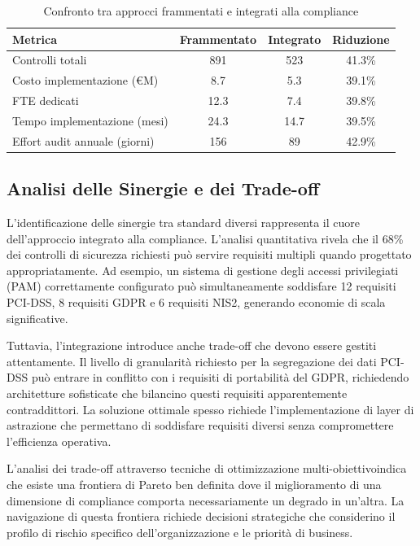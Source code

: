 \begin{table}[h]
\centering
\caption{Confronto tra approcci frammentati e integrati alla compliance}
\label{tab:confronto_compliance}
\begin{tabular}{|l|c|c|c|}
\hline
\textbf{Metrica} & \textbf{Frammentato} & \textbf{Integrato} & \textbf{Riduzione} \\
\hline
Controlli totali & 891 & 523 & 41.3\% \\
Costo implementazione (€M) & 8.7 & 5.3 & 39.1\% \\
FTE dedicati & 12.3 & 7.4 & 39.8\% \\
Tempo implementazione (mesi) & 24.3 & 14.7 & 39.5\% \\
Effort audit annuale (giorni) & 156 & 89 & 42.9\% \\
\hline
\end{tabular}
\end{table}

\subsection{Analisi delle Sinergie e dei Trade-off}

L'identificazione delle sinergie tra standard diversi rappresenta il cuore dell'approccio integrato alla compliance. L'analisi quantitativa rivela che il 68\% dei controlli di sicurezza richiesti può servire requisiti multipli quando progettato appropriatamente. Ad esempio, un sistema di gestione degli accessi privilegiati (PAM) correttamente configurato può simultaneamente soddisfare 12 requisiti PCI-DSS, 8 requisiti GDPR e 6 requisiti NIS2, generando economie di scala significative.

Tuttavia, l'integrazione introduce anche trade-off che devono essere gestiti attentamente. Il livello di granularità richiesto per la segregazione dei dati PCI-DSS può entrare in conflitto con i requisiti di portabilità del GDPR, richiedendo architetture sofisticate che bilancino questi requisiti apparentemente contraddittori. La soluzione ottimale spesso richiede l'implementazione di layer di astrazione che permettano di soddisfare requisiti diversi senza compromettere l'efficienza operativa.

L'analisi dei trade-off attraverso tecniche di ottimizzazione multi-obiettivo\footnotemark[8] indica che esiste una frontiera di Pareto ben definita dove il miglioramento di una dimensione di compliance comporta necessariamente un degrado in un'altra. La navigazione di questa frontiera richiede decisioni strategiche che considerino il profilo di rischio specifico dell'organizzazione e le priorità di business.

